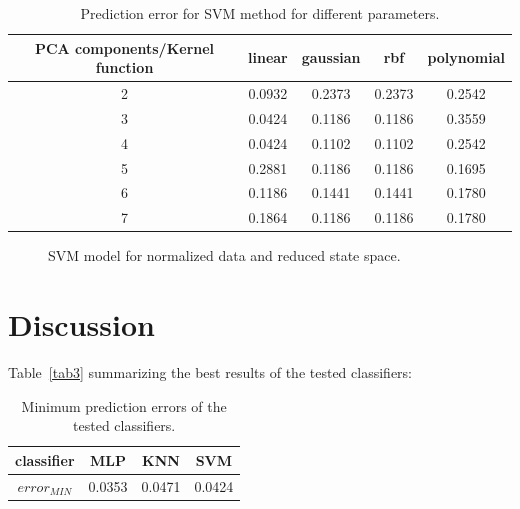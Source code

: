 \documentclass[
10pt, %
a4paper, %
oneside, %
headinclude,footinclude, %
BCOR5mm, %
]{scrartcl}
\begin{document}
\begin{table}[H]
	\centering
	\begin{tabular}{ c | c | c | c | c }
    PCA components/Kernel function & linear & gaussian & rbf & polynomial \\ \hline
    2 & 0.0932 & 0.2373 & 0.2373 & 0.2542 \\ \hline
    3 & \cellcolor{amber!25}0.0424 & 0.1186 & 0.1186 & 0.3559 \\ \hline
    4 & \cellcolor{amber!25}0.0424 & 0.1102 & 0.1102 & 0.2542 \\ \hline
    5 & 0.2881 & 0.1186 & 0.1186 & 0.1695 \\ \hline
    6 & 0.1186 & 0.1441 & 0.1441 & 0.1780 \\ \hline
    7 & 0.1864 & 0.1186 & 0.1186 & 0.1780 \\
  	\end{tabular}
  	\caption{Prediction error for SVM method for different parameters.}
  	\label{tab2}
\end{table}

\begin{figure}[H]
\centering 
{}%
\caption[An example of a floating figure]{SVM model for normalized data and reduced state space.} %
\label{fig:svmnorm2} 
\end{figure}



\section{Discussion}

Table~\vref{tab3} summarizing the best results of the tested classifiers:

\begin{table}[H]
	\centering
	\begin{tabular}{ c | c | c | c  }
    classifier  & MLP & KNN & SVM \\ \hline
    $ error_{MIN} $ & \cellcolor{amber!25}0.0353 & 0.0471 & 0.0424 \\
  	\end{tabular}
  	\caption{Minimum prediction errors of the tested classifiers.}
  	\label{tab3}
\end{table}
\end{document}
